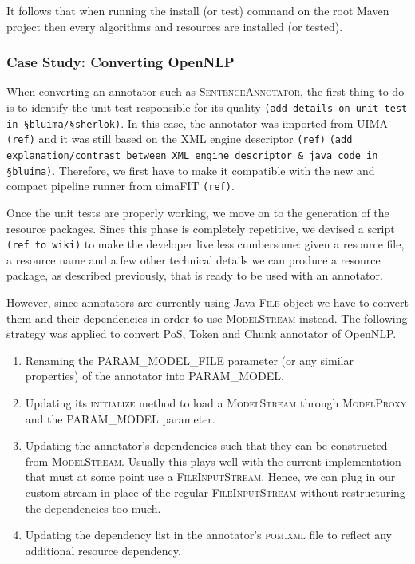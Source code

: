 \documentclass{article}
\newcommand{\id}[1]{\mbox{\textsc{#1}}}
\newcommand{\TODO}[1]{\texttt{\textcolor{YellowOrange}{(#1)}}} %
\begin{document}
It follows that when running the install (or test) command on the root Maven project then every algorithms and resources are installed (or tested).

\subsubsection{Case Study: Converting OpenNLP}

When converting an annotator such as \id{SentenceAnnotator}, the first thing to do is to identify the unit test responsible for its quality \TODO{add details on unit test in §bluima/§sherlok}. In this case, the annotator was imported from UIMA \TODO{ref} and it was still based on the XML engine descriptor \TODO{ref} \TODO{add explanation/contrast between XML engine descriptor \& java code in §bluima}. Therefore, we first have to make it compatible with the new and compact pipeline runner from uimaFIT \TODO{ref}.

Once the unit tests are properly working, we move on to the generation of the resource packages. Since this phase is completely repetitive, we devised a script \TODO{ref to wiki} to make the developer live less cumbersome: given a resource file, a resource name and a few other technical details we can produce a resource package, as described previously, that is ready to be used with an annotator.

However, since annotators are currently using Java \id{File} object we have to convert them and their dependencies in order to use \id{ModelStream} instead. The following strategy was applied to convert PoS, Token and Chunk annotator of OpenNLP.

\begin{enumerate}

\item Renaming the \id{PARAM\_MODEL\_FILE} parameter (or any similar properties) of the annotator into \id{PARAM\_MODEL}.

\item Updating its \id{initialize} method to load a \id{ModelStream} through \id{ModelProxy} and the \id{PARAM\_MODEL} parameter. 

\item Updating the annotator's dependencies such that they can be constructed from \id{ModelStream}. Usually this plays well with the current implementation that must at some point use a \id{FileInputStream}. Hence, we can plug in our custom stream in place of the regular \id{FileInputStream} without restructuring the dependencies too much.

\item Updating the dependency list in the annotator's \id{pom.xml} file to reflect any additional resource dependency.

\end{enumerate}
\end{document}
